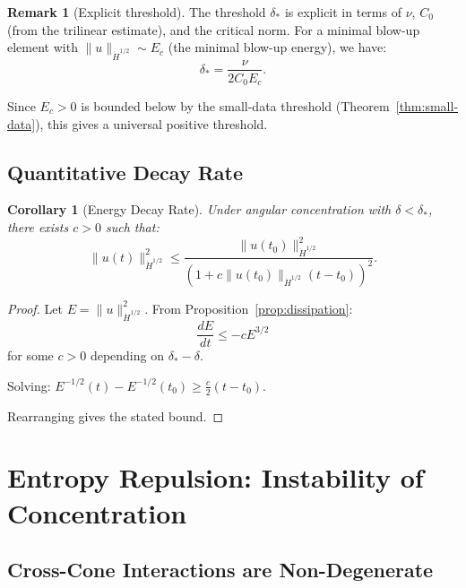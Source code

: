 \documentclass[11pt]{article}
\newtheorem{corollary}[theorem]{Corollary}
\theoremstyle{definition}
\newtheorem{remark}[theorem]{Remark}
\begin{document}
\begin{remark}[Explicit threshold]
The threshold $\delta_*$ is explicit in terms of $\nu$, $C_0$ (from the trilinear estimate), and the critical norm. For a minimal blow-up element with $\|u\|_{\dot{H}^{1/2}} \sim E_c$ (the minimal blow-up energy), we have:
\begin{equation}
\delta_* = \frac{\nu}{2 C_0 E_c}.
\end{equation}

Since $E_c > 0$ is bounded below by the small-data threshold (Theorem~\ref{thm:small-data}), this gives a universal positive threshold.
\end{remark}

\subsection{Quantitative Decay Rate}

\begin{corollary}[Energy Decay Rate]\label{cor:decay}
Under angular concentration with $\delta < \delta_*$, there exists $c > 0$ such that:
\begin{equation}
\|u(t)\|_{\dot{H}^{1/2}}^2 \leq \frac{\|u(t_0)\|_{\dot{H}^{1/2}}^2}{(1 + c\|u(t_0)\|_{\dot{H}^{1/2}}(t - t_0))^2}.
\end{equation}
\end{corollary}

\begin{proof}
Let $E = \|u\|_{\dot{H}^{1/2}}^2$. From Proposition~\ref{prop:dissipation}:
\begin{equation}
\frac{dE}{dt} \leq -cE^{3/2}
\end{equation}
for some $c > 0$ depending on $\delta_* - \delta$.

Solving: $E^{-1/2}(t) - E^{-1/2}(t_0) \geq \frac{c}{2}(t - t_0)$.

Rearranging gives the stated bound.
\end{proof}

\section{Entropy Repulsion: Instability of Concentration}

\subsection{Cross-Cone Interactions are Non-Degenerate}
\end{document}
